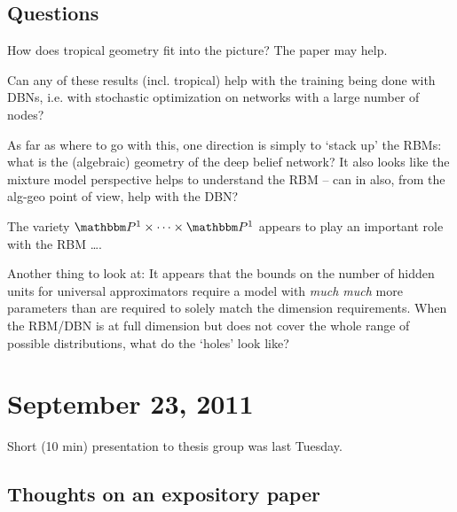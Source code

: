\documentclass[12pt]{article}
\begin{document}
\subsection{Questions}

How does tropical geometry fit into the picture?  The paper \cite{PS03} may help.

Can any of these results (incl. tropical) help with the training being done with
DBNs, i.e. with stochastic optimization on networks with a large number of
nodes?

As far as where to go with this, one direction is simply to `stack up' the RBMs:
what is the (algebraic) geometry of the deep belief network?  It also looks like
the mixture model perspective helps to understand the RBM -- can in also, from
the alg-geo point of view, help with the DBN?

The variety $\Proj^1 \times \cdots \times \Proj^1$ appears to play an important
role with the RBM \dots.

Another thing to look at:  It appears that the bounds on the number of hidden
units for universal approximators require a model with \emph{much much} more
parameters than are required to solely match the dimension requirements.  When
the RBM/DBN is at full dimension but does not cover the whole range of possible
distributions, what do the `holes' look like?

\section{September 23, 2011}

Short (10 min) presentation to thesis group was last Tuesday.

\subsection{Thoughts on an expository paper}
\end{document}
